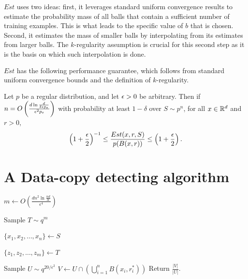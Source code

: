 $Est$ uses two ideas: first, it leverages standard uniform convergence results to estimate the probability mass of all balls that contain a sufficient number of training examples. This is what leads to the specific value of $b$ that is chosen. Second, it estimates the mass of smaller balls by interpolating from its estimates from larger balls. The $k$-regularity assumption is crucial for this second step as it is the basis on which such interpolation is done. 

$Est$ has the following performance guarantee, which follows from standard uniform convergence bounds and the definition of $k$-regularity. 
\begin{proposition}\label{prop:est_works}
Let $p$ be a regular distribution, and let $\epsilon >0$ be arbitrary. Then if $n = O\left(\frac{d\ln\frac{d}{\delta \epsilon p_\epsilon}}{\epsilon^2 p_\epsilon}\right)$ with probability at least $1 - \delta$ over $S \sim p^n$, for all $x \in \mathbb{R}^d$ and $r > 0$, $$\left(1+\frac{\epsilon}{2}\right)^{-1}\leq \frac{Est(x, r, S)}{p(B(x, r))} \leq \left(1+\frac{\epsilon}{2}\right).$$
\end{proposition}

\section{A Data-copy detecting algorithm}

\begin{algorithm}    

\caption{$DataCopyDetect(S, q, m)$}
\label{alg:main}   

   \DontPrintSemicolon
   
   $m \leftarrow O\left(\frac{dn^2\ln \frac{nd}{\delta\epsilon}}{\epsilon^4}\right)$\;
   
   Sample $T \sim q^m$\;
   
   $\{x_1, x_2, \dots, x_n\} \leftarrow S$\;
   
   $\{z_1, z_2, \dots, z_m\} \leftarrow T$\;

	Sample $U \sim q^{20/\epsilon^2}$\;
	$V \leftarrow U \cap \left(\bigcup_{i=1}^n B(x_i, r_i^*)\right)$\;
	Return $\frac{|V|}{|U|}$.\;
	
	

\end{algorithm}


